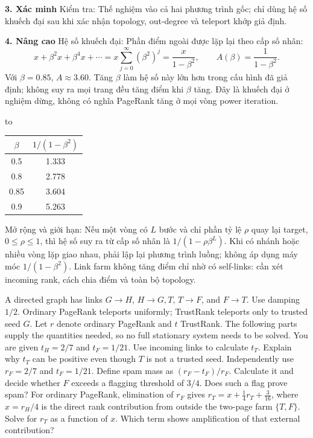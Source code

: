 \documentclass[10pt,a4paper,twocolumn]{article}
\newcommand{\key}[1]{#1:\enspace}
\newenvironment{examtable}[1]{%
  \par\addvspace{2pt}\noindent\hbox to \linewidth\bgroup\hfil
  \setlength{\tabcolsep}{4pt}%
  \renewcommand{\arraystretch}{1.12}\begin{tabular}{#1}%
}{\end{tabular}\hfil\egroup\par\addvspace{2pt}}
\newcommand{\unitheading}[2]{%
  \par\addvspace{1pt}\noindent\textbf{#1. #2}\enspace}
\newcommand{\unitverification}{\unitheading{3}{Xác minh}}
\newcommand{\unitadvanced}{\unitheading{4}{Nâng cao}}
\begin{document}
\unitverification
\key{Kiểm tra} Thế nghiệm vào cả hai phương trình gốc; chỉ dùng hệ số khuếch đại sau khi xác nhận topology, out-degree và teleport khớp giả định.

\unitadvanced
\key{Hệ số khuếch đại} Phần điểm ngoài được lặp lại theo cấp số nhân:
\[
x+\beta^2x+\beta^4x+\cdots
=x\sum_{j=0}^{\infty}(\beta^2)^j
=\frac{x}{1-\beta^2},\qquad
\boxed{A(\beta)=\frac{1}{1-\beta^2}}.
\]
Với $\beta=0.85$, $A\approx3.60$. Tăng $\beta$ làm hệ số này lớn hơn trong cấu hình đã giả định; không suy ra mọi trang đều tăng điểm khi $\beta$ tăng. Đây là khuếch đại ở nghiệm dừng, không có nghĩa PageRank tăng ở mọi vòng power iteration.
\begin{examtable}{@{}c c@{}}
\toprule
$\beta$ & $1/(1-\beta^2)$\\
\midrule
0.5 & 1.333\\
0.8 & 2.778\\
0.85 & 3.604\\
0.9 & 5.263\\
\bottomrule
\end{examtable}

\key{Mở rộng và giới hạn} Nếu một vòng có $L$ bước và chỉ phần tỷ lệ $\rho$ quay lại target, $0\le\rho\le1$, thì hệ số suy ra từ cấp số nhân là $1/(1-\rho\beta^L)$. Khi có nhánh hoặc nhiều vòng lặp giao nhau, phải lập lại phương trình luồng; không áp dụng máy móc $1/(1-\beta^2)$. Link farm không tăng điểm chỉ nhờ có self-links: cần xét incoming rank, cách chia điểm và toàn bộ topology.


A directed graph has links $G\to H$, $H\to G,T$, $T\to F$, and $F\to T$. Use damping $1/2$. Ordinary PageRank teleports uniformly; TrustRank teleports only to trusted seed $G$. Let $r$ denote ordinary PageRank and $t$ TrustRank. The following parts supply the quantities needed, so no full stationary system needs to be solved.
 You are given $t_H=2/7$ and $t_F=1/21$. Use incoming links to calculate $t_T$. Explain why $t_T$ can be positive even though $T$ is not a trusted seed.
 Independently use $r_F=2/7$ and $t_F=1/21$. Define spam mass as $(r_F-t_F)/r_F$. Calculate it and decide whether $F$ exceeds a flagging threshold of $3/4$. Does such a flag prove spam?
 For ordinary PageRank, elimination of $r_F$ gives $r_T=x+\tfrac14r_T+\tfrac3{16}$, where $x=r_H/4$ is the direct rank contribution from outside the two-page farm $\{T,F\}$. Solve for $r_T$ as a function of $x$. Which term shows amplification of that external contribution?
\end{document}
